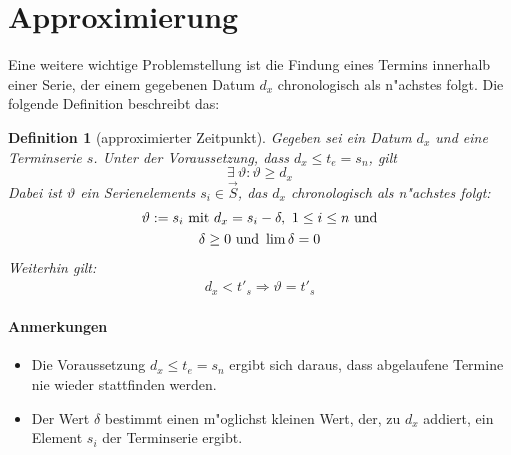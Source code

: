 \documentclass[a4paper]{article}
\numberwithin{equation}{section}
\newtheorem{dfn}{Definition}
\begin{document}
\section{Approximierung}
Eine weitere wichtige Problemstellung ist die Findung eines Termins innerhalb
einer Serie, der einem gegebenen Datum $d_x$ chronologisch als n"achstes folgt.
Die folgende Definition beschreibt das:
\begin{dfn}[approximierter Zeitpunkt]\label{def:approx}
  Gegeben sei ein Datum $d_x$ und eine Terminserie $s$. Unter der Voraussetzung,
  dass $d_x \le t_e = s_n$, gilt
  \begin{equation}\exists\ \vartheta : \vartheta \ge d_x\end{equation}
  Dabei ist $\vartheta$ ein Serienelements $s_i \in \vec{S}$, das $d_x$
  chronologisch als n"achstes folgt:
  \begin{gather}\label{eqn:approxGeneral}
    \vartheta := s_i \textnormal{ mit } d_x = s_i - \delta,\ 1 \le i \le n
      \textnormal{ und} \\
    \delta \ge 0 \textnormal{ und } \lim \delta = 0
  \end{gather}
  Weiterhin gilt:
  \begin{eqnarray}\label{eqn:approxEasy}
    d_x < t'_s \Rightarrow \vartheta = t'_s
  \end{eqnarray}
\end{dfn}

\paragraph{Anmerkungen}
\begin{itemize}
\item Die Voraussetzung $d_x \le t_e = s_n$ ergibt sich daraus, dass abgelaufene
  Termine nie wieder stattfinden werden.
\item Der Wert $\delta$ bestimmt einen m"oglichst kleinen Wert, der, zu $d_x$
  addiert, ein Element $s_i$ der Terminserie ergibt.
\end{itemize}
\end{document}
